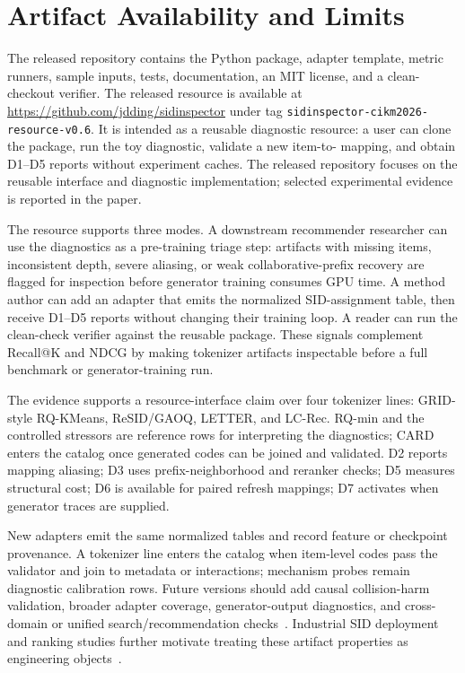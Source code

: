 \section{Artifact Availability and Limits}

The released repository contains the \tool Python package, adapter template,
metric runners, sample inputs, tests, documentation, an MIT license, and a
clean-checkout verifier. The released resource is available at
\url{https://github.com/jdding/sidinspector} under tag
\texttt{sidinspector-cikm2026-resource-v0.6}. It is intended as a reusable
diagnostic resource: a user can clone the package, run the toy
diagnostic, validate a new item-to-\sid{} mapping, and obtain D1--D5 reports
without experiment caches. The released repository focuses on the reusable
interface and diagnostic implementation; selected experimental evidence is
reported in the paper.

The resource supports three modes. A downstream recommender
researcher can use the diagnostics as a pre-training triage step: artifacts
with missing items, inconsistent depth, severe aliasing, or weak
collaborative-prefix recovery are flagged for inspection before generator
training consumes GPU time. A method author can add an adapter that emits the
normalized SID-assignment table, then receive D1--D5 reports without
changing their training loop. A reader can run the clean-check verifier
against the reusable package. These signals complement
Recall@K and NDCG by making tokenizer artifacts inspectable before a full
benchmark or generator-training run.

The evidence supports a resource-interface claim over four tokenizer lines:
GRID-style RQ-KMeans, ReSID/GAOQ, LETTER, and LC-Rec. RQ-min and the controlled
stressors are reference rows for interpreting the diagnostics; CARD enters the
catalog once generated codes can be joined and validated. D2 reports mapping
aliasing; D3 uses prefix-neighborhood and reranker checks; D5 measures
structural cost; D6 is available for paired refresh mappings; D7 activates when generator
traces are supplied.

New adapters emit the same normalized tables and record feature or checkpoint
provenance. A tokenizer line enters the catalog when item-level codes pass the
validator and join to metadata or interactions; mechanism probes remain
diagnostic calibration rows. Future versions should add causal collision-harm
validation, broader adapter coverage, generator-output diagnostics, and
cross-domain or unified search/recommendation checks~\cite{li2024survey,hu2025gencdr,penha2025jointsid}.
Industrial SID deployment and
ranking studies further motivate treating these artifact properties as
engineering objects~\cite{singh2023bettersemanticids,li2026sidcoord,ju2026snapchatsid,xu2026largescalegenrec}.
